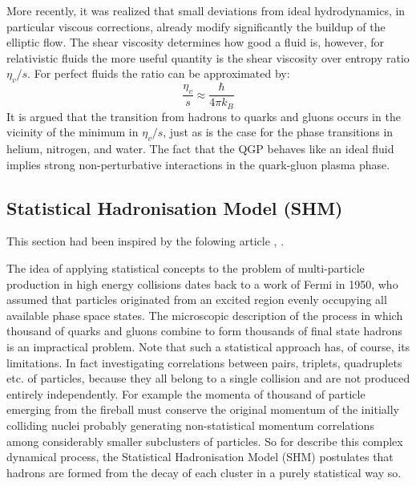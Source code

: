 \documentclass[12pt,a4paper]{book}
\begin{document}
	More recently, it was realized that small deviations from ideal hydrodynamics, in particular viscous corrections, already modify significantly the buildup of the elliptic flow. The shear viscosity determines how good a fluid is, however, for relativistic
	fluids the more useful quantity is the shear viscosity over entropy ratio $\eta_v/s$. For perfect	fluids the ratio can be approximated by:
	\begin{equation}
		\frac{\eta_v}{s} \approx \frac{\hbar}{4\pi k_B}
	\end{equation}
	It is argued that the transition from hadrons to quarks and gluons	occurs in the vicinity of the minimum in $\eta_v/s$, just as is the case for the phase transitions	in helium, nitrogen, and water. The fact that the QGP behaves like an ideal fluid implies strong non-perturbative interactions in the quark-gluon plasma phase.
	
	
	\subsection{Statistical Hadronisation Model (SHM)}
	This section had been inspired by the folowing article \cite{becattini2009introductionstatisticalhadronizationmodel}, \cite{charm_hierarchy_in_the_statistical_hadronization_model} \cite{heinz2004conceptsheavyionphysics} \cite{amsdottorato9036}.
	
	The idea of applying statistical concepts to the problem of multi-particle production in high energy collisions dates back to a work of Fermi in 1950, who assumed that particles originated from an excited region evenly occupying all available phase space states. The microscopic description of the process in which thousand of quarks and gluons combine to form	thousands of final state hadrons is an impractical problem. Note that such a statistical approach has, of course, its limitations. In fact investigating correlations between pairs, triplets, quadruplets etc. of particles, because they all belong to a single collision and are not produced entirely independently. For example the momenta of thousand of particle emerging from the fireball must conserve the original momentum of the initially colliding nuclei probably generating non-statistical momentum correlations among considerably smaller subclusters of particles. So for describe this complex dynamical process, the Statistical Hadronisation Model (SHM) postulates that hadrons are formed from the decay of each cluster in a purely statistical way so. 
		
\end{document}

